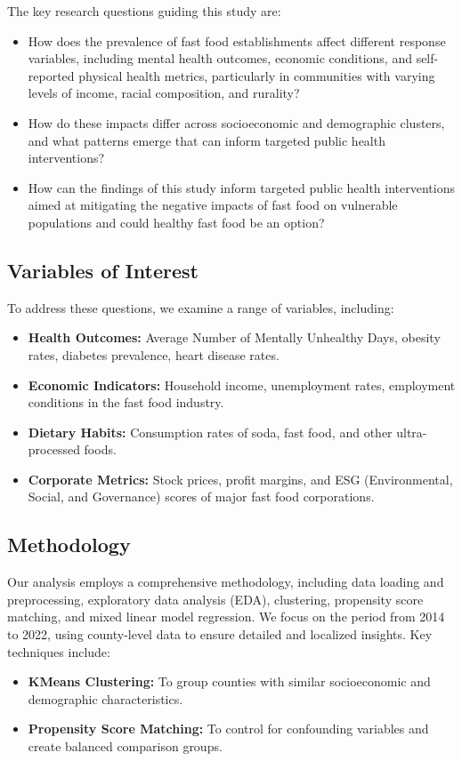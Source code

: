 \documentclass[letterpaper, 11pt]{report}
\begin{document}
The key research questions guiding this study are:

\begin{itemize}
    \item How does the prevalence of fast food establishments affect different response variables, including mental health outcomes, economic conditions, and self-reported physical health metrics, particularly in communities with varying levels of income, racial composition, and rurality?
    \item How do these impacts differ across socioeconomic and demographic clusters, and what patterns emerge that can inform targeted public health interventions?
    \item How can the findings of this study inform targeted public health interventions aimed at mitigating the negative impacts of fast food on vulnerable populations and could healthy fast food be an option?
\end{itemize}




\subsection{Variables of Interest}
To address these questions, we examine a range of variables, including:
\begin{itemize}
    \item \textbf{Health Outcomes:} Average Number of Mentally Unhealthy Days, obesity rates, diabetes prevalence, heart disease rates.
    \item \textbf{Economic Indicators:} Household income, unemployment rates, employment conditions in the fast food industry.
    \item \textbf{Dietary Habits:} Consumption rates of soda, fast food, and other ultra-processed foods.
    \item \textbf{Corporate Metrics:} Stock prices, profit margins, and ESG (Environmental, Social, and Governance) scores of major fast food corporations.
\end{itemize}

\subsection{Methodology}

Our analysis employs a comprehensive methodology, including data loading and preprocessing, exploratory data analysis (EDA), clustering, propensity score matching, and mixed linear model regression. We focus on the period from 2014 to 2022, using county-level data to ensure detailed and localized insights. Key techniques include:
\begin{itemize}
    \item \textbf{KMeans Clustering:} To group counties with similar socioeconomic and demographic characteristics.
    \item \textbf{Propensity Score Matching:} To control for confounding variables and create balanced comparison groups.
\end{itemize}
\end{document}
